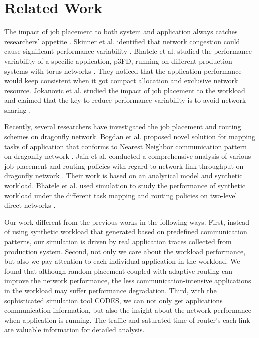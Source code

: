 \documentclass[conference,compsoc]{IEEEtran}
\begin{document}
\section{Related Work}
\label{sec:related work}

The impact of job placement to both system and application always catches researchers' appetite \cite{dskinner} \cite{abhinav-sc13} \cite{jose-ipdps15}. Skinner et al. identified that network congestion could cause significant performance variability \cite{dskinner}. Bhatele et al. studied the performance variability of a specific application, p3FD, running on different production systems with torus networks \cite{abhinav-sc13}. They noticed that the application performance would keep consistent when it got compact allocation and exclusive network resource. Jokanovic et al. studied the impact of job placement to the workload and claimed that the key to reduce performance variability is to avoid network sharing \cite{jose-ipdps15}. 

Recently, several researchers have investigated the job placement and routing schemes on dragonfly network. Bogdan et al. proposed novel solution for mapping tasks of application that conforms to Nearest Neighbor communication pattern on dragonfly network \cite{hoefler-hpdc14}. Jain et al. conducted a comprehensive analysis of various job placement and routing policies with regard to network link throughput on dragonfly network \cite{jain-sc14}. Their work is based on an analytical model and synthetic workload. Bhatele et al. used simulation to study the performance of synthetic workload under the different task mapping and routing policies on two-level direct networks \cite{bhatele-sc11}.


Our work different from the previous works in the following ways. First, instead of using synthetic workload that generated based on predefined communication patterns, our simulation is driven by real application traces collected from production system. Second, not only we care about the workload performance, but also we pay attention to each individual application in the workload. We found that although random placement coupled with adaptive routing can improve the network performance, the less communication-intensive applications in the workload may suffer performance degradation. Third, with the sophisticated simulation tool CODES, we can not only get applications communication information, but also the insight about the network performance when application is running. The traffic and saturated time of router's each link are valuable information for detailed analysis.
\end{document}
